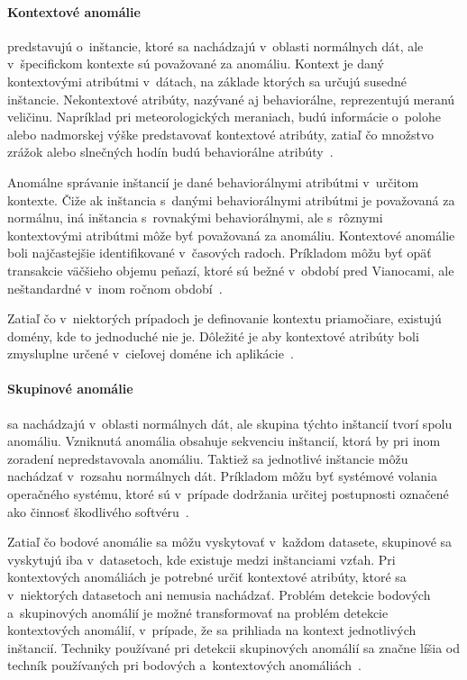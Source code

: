 \documentclass[a4paper,twoside,slovak,12pt]{article}
\begin{document}
\paragraph{Kontextové anomálie} predstavujú o~inštancie, ktoré sa nachádzajú
v~oblasti normálnych dát, ale v~špecifickom kontexte sú považované za anomáliu.
Kontext je daný kontextovými atribútmi v~dátach, na základe ktorých sa určujú
susedné inštancie. Nekontextové atribúty, nazývané aj behaviorálne, reprezentujú
meranú veličinu. Napríklad pri meteorologických meraniach, budú informácie
o~polohe alebo nadmorskej výške predstavovať kontextové atribúty, zatiaľ čo
množstvo zrážok alebo slnečných hodín budú behaviorálne
atribúty~\cite{Chandola2009}.

Anomálne správanie inštancií je dané behaviorálnymi atribútmi v~určitom kontexte.
Čiže ak inštancia s~danými behaviorálnymi atribútmi je považovaná za normálnu,
iná inštancia s~rovnakými behaviorálnymi, ale s~rôznymi kontextovými atribútmi
môže byť považovaná za anomáliu. Kontextové anomálie boli najčastejšie
identifikované v~časových radoch. Príkladom môžu byť opäť transakcie väčšieho
objemu peňazí, ktoré sú bežné v~období pred Vianocami, ale neštandardné v~inom
ročnom období~\cite{Chandola2009}.

Zatiaľ čo v~niektorých prípadoch je definovanie kontextu priamočiare, existujú
domény, kde to jednoduché nie je. Dôležité je aby kontextové atribúty boli
zmysluplne určené v~cieľovej doméne ich aplikácie~\cite{Chandola2009}.

\paragraph{Skupinové anomálie} sa nachádzajú v~oblasti normálnych dát, ale
skupina týchto inštancií tvorí spolu anomáliu. Vzniknutá anomália obsahuje
sekvenciu inštancií, ktorá by pri inom zoradení nepredstavovala anomáliu.
Taktiež sa jednotlivé inštancie môžu nachádzať v~rozsahu normálnych dát.
Príkladom môžu byť systémové volania operačného systému, ktoré sú v~prípade
dodržania určitej postupnosti označené ako činnosť škodlivého
softvéru~\cite{Chandola2009}.

Zatiaľ čo bodové anomálie sa môžu vyskytovať v~každom datasete, skupinové sa
vyskytujú iba v~datasetoch, kde existuje medzi inštanciami vzťah. Pri
kontextových anomáliách je potrebné určiť kontextové atribúty, ktoré sa
v~niektorých datasetoch ani nemusia nachádzať. Problém detekcie bodových
a~skupinových anomálií je možné transformovať na problém detekcie kontextových
anomálií, v~prípade, že sa prihliada na kontext jednotlivých inštancií. Techniky
používané pri detekcii skupinových anomálií sa značne líšia od techník
používaných pri bodových a~kontextových anomáliách~\cite{Chandola2009}.
\end{document}
